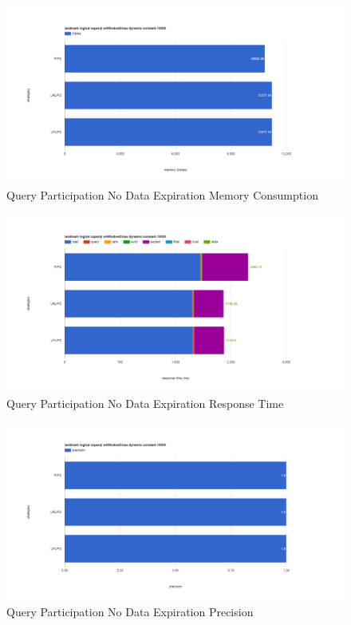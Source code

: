 \begin{figure}[!htbp]
	\centering
    \includegraphics[width=6.5in]{img/app3-qp-no-m.png}
    \caption{Query Participation No Data Expiration Memory Consumption}
\end{figure}
\begin{figure}[!htbp]
	\centering
    \includegraphics[width=6.5in]{img/app3-qp-no-r.png}
    \caption{Query Participation No Data Expiration Response Time}
\end{figure}
\begin{figure}[!htbp]
	\centering
    \includegraphics[width=6.5in]{img/app3-qp-no-p.png}
    \caption{Query Participation No Data Expiration Precision}
\end{figure}
